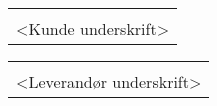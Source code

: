 \vspace{1 cm}

\begin{table}[h!]
	\begin{tabular}{@{}p{2.5in}@{}}
		\hrulefill \\
		<Kunde underskrift> 
	\end{tabular} \hfill
	\quad
	\begin{tabular}{@{}p{2.5in}@{}}
		\hrulefill \\
		<Leverandør underskrift> \\
	\end{tabular}
\end{table}


\clearpage

